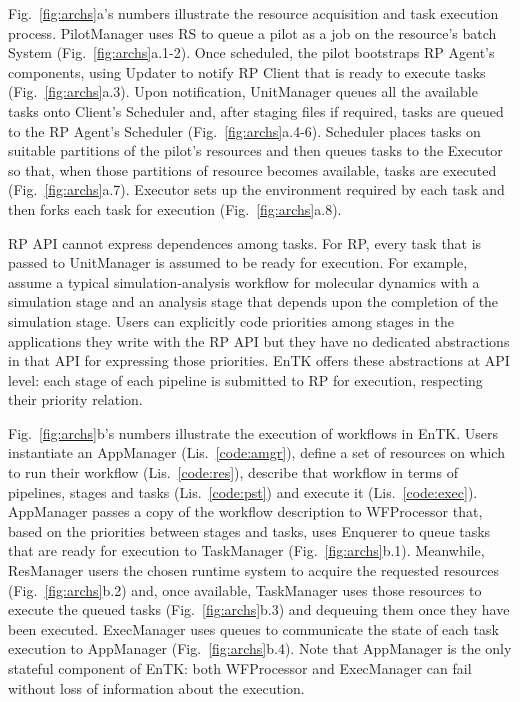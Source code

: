 \documentclass[preprint,12pt, a4paper]{elsarticle}
\begin{document}
Fig.~\ref{fig:archs}a's numbers illustrate the resource acquisition and task
execution process. PilotManager uses RS to queue a pilot as a job on the
resource's batch System (Fig.~\ref{fig:archs}a.1-2). Once scheduled, the
pilot bootstraps RP Agent's components, using Updater to notify RP Client
that is ready to execute tasks (Fig.~\ref{fig:archs}a.3). Upon notification,
UnitManager queues all the available tasks onto Client's Scheduler and, after
staging files if required, tasks are queued to the RP Agent's Scheduler
(Fig.~\ref{fig:archs}a.4-6). Scheduler places tasks on suitable partitions of
the pilot's resources and then queues tasks to the Executor so that, when
those partitions of resource becomes available, tasks are executed
(Fig.~\ref{fig:archs}a.7). Executor sets up the environment required by each
task and then forks each task for execution (Fig.~\ref{fig:archs}a.8). 

RP API cannot express dependences among tasks. For RP, every task that is
passed to UnitManager is assumed to be ready for execution. For example,
assume a typical simulation-analysis workflow for molecular dynamics with a
simulation stage and an analysis stage that depends upon the completion of
the simulation stage. Users can explicitly code priorities among stages in
the applications they write with the RP API but they have no dedicated
abstractions in that API for expressing those priorities. EnTK offers these
abstractions at API level: each stage of each pipeline is submitted to RP for
execution, respecting their priority relation.

Fig.~\ref{fig:archs}b's numbers illustrate the execution of workflows in
EnTK\@. Users instantiate an AppManager (Lis.~\ref{code:amgr}), define a set
of resources on which to run their workflow (Lis.~\ref{code:res}), describe
that workflow in terms of pipelines, stages and tasks (Lis.~\ref{code:pst})
and execute it (Lis.~\ref{code:exec}). AppManager passes a copy of the
workflow description to WFProcessor that, based on the priorities between
stages and tasks, uses Enquerer to queue tasks that are ready for execution
to TaskManager (Fig.~\ref{fig:archs}b.1). Meanwhile, ResManager users
the chosen runtime system to acquire the requested resources
(Fig.~\ref{fig:archs}b.2) and, once available, TaskManager uses those
resources to execute the queued tasks (Fig.~\ref{fig:archs}b.3) and dequeuing
them once they have been executed. ExecManager uses queues to communicate the
state of each task execution to AppManager (Fig.~\ref{fig:archs}b.4). Note
that AppManager is the only stateful component of EnTK\@: both WFProcessor
and ExecManager can fail without loss of information about the execution.
\end{document}
